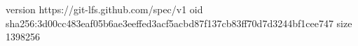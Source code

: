 version https://git-lfs.github.com/spec/v1
oid sha256:3d00cc483eaf05b6ae3eeffed3acf5acbd87f137cb83ff70d7d3244bf1cee747
size 1398256
